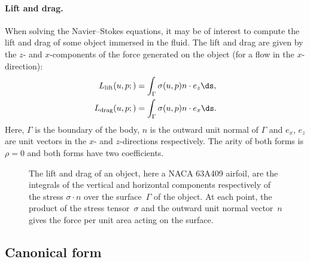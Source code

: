 \paragraph{Lift and drag.}

When solving the Navier--Stokes equations, it may be of interest to
compute the lift and drag of some object immersed in the fluid. The
lift and drag are given by the $z$- and $x$-components of the force
generated on the object (for a flow in the $x$-direction):
\begin{equation}
  \begin{split}
    L_{\mathrm{lift}}(u, p;) &= \int_{\Gamma} \sigma(u, p) n \cdot e_z \ds, \\
    L_{\mathrm{drag}}(u, p;) &= \int_{\Gamma} \sigma(u, p) n \cdot e_x \ds.
  \end{split}
\end{equation}
Here, $\Gamma$ is the boundary of the body, $n$ is the outward
unit normal of $\Gamma$ and $e_x$, $e_z$ are unit vectors
in the $x$- and $z$-directions respectively. The arity of both forms
is $\rho = 0$ and both forms have two coefficients.

\begin{figure}
  \centering
  \caption{The lift and drag of an object, here a NACA 63A409
      airfoil, are the integrals of the vertical and horizontal
      components respectively of the stress $\sigma \cdot n$ over the
      surface~$\Gamma$ of the object. At each point, the product of
      the stress tensor~$\sigma$ and the outward unit normal
      vector~$n$ gives the force per unit area acting on the
      surface.}
\end{figure}

\subsection{Canonical form}


